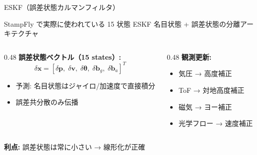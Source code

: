 \begin{frame}{ESKF（誤差状態カルマンフィルタ）}
  \begin{block}{StampFly で実際に使われている 15 状態 ESKF}
    名目状態 + 誤差状態の分離アーキテクチャ
  \end{block}

  \vspace{0.3em}

  {\small
  \begin{columns}[t]
    \begin{column}{0.48\textwidth}
      \textbf{誤差状態ベクトル（15 states）:}
      \[
        \delta\mathbf{x} = [\delta\mathbf{p},\;\delta\mathbf{v},\;\delta\boldsymbol{\theta},\;\delta\mathbf{b}_g,\;\delta\mathbf{b}_a]^T
      \]
      \begin{itemize}
        \item 予測: 名目状態はジャイロ/加速度で直接積分
        \item 誤差共分散のみ伝播
      \end{itemize}
    \end{column}
    \begin{column}{0.48\textwidth}
      \textbf{観測更新:}
      \begin{itemize}
        \item 気圧 → 高度補正
        \item ToF → 対地高度補正
        \item 磁気 → ヨー補正
        \item 光学フロー → 速度補正
      \end{itemize}
    \end{column}
  \end{columns}
  }

  \vspace{0.3em}
  {\footnotesize \textbf{利点:} 誤差状態は常に小さい → 線形化が正確}
\end{frame}

